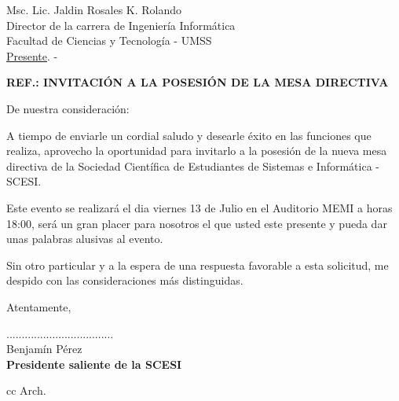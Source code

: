 \documentclass[letterpaper,12pt]{letter}
\begin{document}
\date {12 de julio de 2012}
\begin{letter}{ Msc. Lic. Jaldin Rosales K. Rolando \\ Director de la carrera de Ingenier\'ia Inform\'atica \\ Facultad de Ciencias y Tecnolog\'ia - UMSS \\ \underline {Presente}. -}

\begin{center}
	\opening{\textbf{REF.: INVITACI\'ON A LA POSESI\'ON DE LA MESA DIRECTIVA}}
\end{center}

De nuestra consideración:

A tiempo de enviarle un cordial saludo y desearle éxito en las funciones que realiza, aprovecho 
la oportunidad para invitarlo a la posesi\'on de la nueva mesa directiva de la Sociedad Cient\'ifica 
de Estudiantes de Sistemas e Inform\'atica - SCESI.

Este evento se realizar\'a el dia viernes 13 de Julio en el Auditorio MEMI a horas 18:00, ser\'a 
un gran placer para nosotros el que usted este presente y pueda dar unas palabras alusivas al evento.

Sin otro particular y a la espera de una respuesta favorable a esta solicitud, me despido con las 
consideraciones más distinguidas.

Atentamente,

\vspace{2.5cm}

\begin{center}
...................................\\
Benjam\'in P\'erez\\
{\bfseries Presidente saliente de la SCESI}
\end{center}
\vspace{1cm}
cc Arch.
\end{letter}
\end{document}
